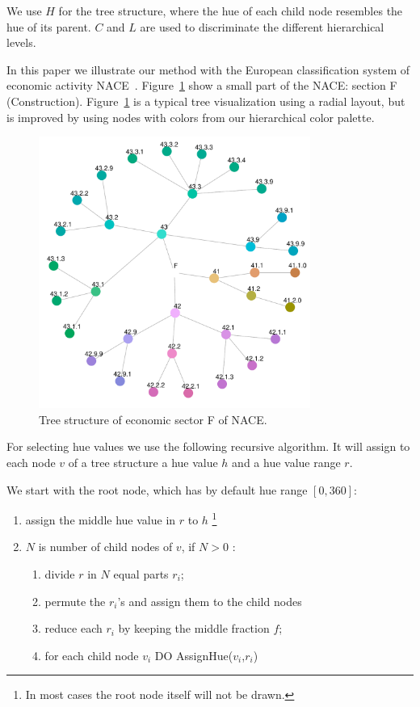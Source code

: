 \documentclass[review]{vgtc}                 %
\begin{document}
We use $H$ for the tree structure, where the hue of each child node resembles the hue of its parent. $C$ and $L$ are used to discriminate the different hierarchical levels.

In this paper we illustrate our method with the European classification system of economic activity NACE~\cite{nace}. Figure~\ref{fig:sbiF} show a small part of the NACE: section F (Construction). Figure~\ref{fig:sbiF} is a typical tree visualization using a radial layout, but is improved by using nodes with colors from our hierarchical color palette. 

\begin{figure}[htb]
  \centering
  \includegraphics[width=3.5in]{sbi_F.pdf}
  \caption{Tree structure of economic sector F of NACE.}\label{fig:sbiF}
\end{figure}

For selecting hue values we use the following recursive algorithm. It will assign to each node $v$ of a tree structure a hue value $h$ and a hue value range $r$.

We start with the root node, which has by default hue range $[0, 360]$:

\begin{enumerate} \itemsep1pt \parskip0pt 
\item assign the middle hue value in $r$ to $h$ \footnote{In most cases the root node itself will not be drawn.}
\item $N$ is number of child nodes of $v$, if $N>0$ :
\begin{enumerate}[i] \itemsep1pt \parskip0pt 
\item divide $r$ in $N$ equal parts $r_i$;
\item permute the $r_i$'s and assign them to the child nodes
\item reduce each $r_i$ by keeping the middle fraction $f$;
\item for each child node $v_i$ DO AssignHue($v_i$,$r_i$)
\end{enumerate}
\end{enumerate}
\end{document}
